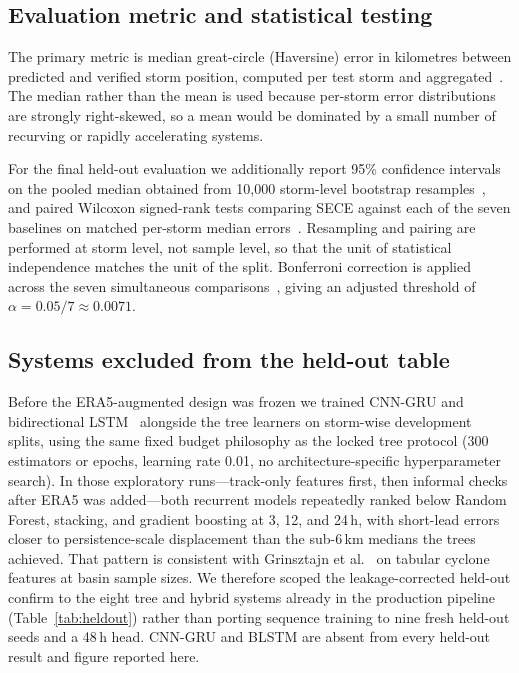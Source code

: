 \documentclass[10pt,twocolumn,a4paper]{article}
\newcommand{\sece}{SECE}
\newcommand{\era}{ERA5}
\begin{document}
\subsection{Evaluation metric and statistical testing}
The primary metric is median great-circle (Haversine) error in kilometres between
predicted and verified storm position, computed per test storm and
aggregated~\cite{sinnott1984}. The median rather than the mean
is used because per-storm error distributions are strongly right-skewed, so a
mean would be dominated by a small number of recurving or rapidly accelerating
systems.

For the final held-out evaluation we additionally report 95\% confidence
intervals on the pooled median obtained from 10{,}000 storm-level bootstrap
resamples~\cite{efron1979}, and paired Wilcoxon
signed-rank tests comparing \sece{} against each of the seven baselines on
matched per-storm median errors~\cite{wilcoxon1945}. Resampling
and pairing are performed at storm level, not sample level, so that the unit of
statistical independence matches the unit of the split. Bonferroni correction is
applied across the seven simultaneous
comparisons~\cite{bonferroni1936}, giving an adjusted threshold of
$\alpha = 0.05/7 \approx 0.0071$.

\subsection{Systems excluded from the held-out table}
\label{sec:dlscope}
Before the \era{}-augmented design was frozen we trained CNN-GRU and
bidirectional LSTM~\cite{lian2020novel,graves2005blstm} alongside the tree
learners on storm-wise development splits, using the same fixed budget philosophy
as the locked tree protocol (300 estimators or epochs, learning rate 0.01, no
architecture-specific hyperparameter search). In those exploratory runs---track-only
features first, then informal checks after \era{} was added---both recurrent
models repeatedly ranked below Random Forest, stacking, and gradient boosting at
3, 12, and 24\,h, with short-lead errors closer to persistence-scale displacement
than the sub-6\,km medians the trees achieved. That pattern is consistent with
Grinsztajn et al.~\cite{grinsztajn2022tree} on tabular cyclone features at basin
sample sizes. We therefore scoped the leakage-corrected held-out confirm to the
eight tree and hybrid systems already in the production pipeline
(Table~\ref{tab:heldout}) rather than porting sequence training to nine fresh
held-out seeds and a 48\,h head. CNN-GRU and BLSTM are absent from every held-out
result and figure reported here.
\end{document}
